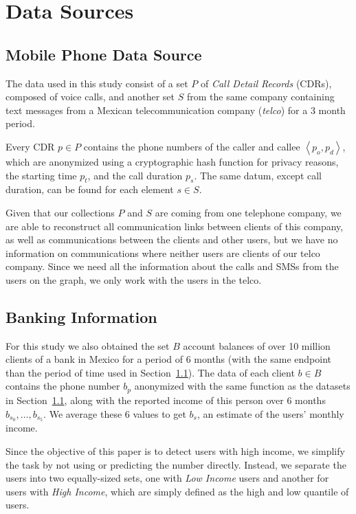 \section{Data Sources}
\label{sec:data_sources}

\subsection{Mobile Phone Data Source}
\label{subsec:telcoinformation}

The data used in this study consist of a set $P$ of \textit{Call Detail Records} (CDRs), composed of voice calls, and another set $S$ from the same company containing text messages from a Mexican telecommunication company (\textit{telco}) for a 3 month period.

Every CDR $p \in P$ contains the phone numbers of the caller and callee $\left< p_o, p_d \right>$, which are anonymized using a cryptographic hash function for privacy reasons, the starting time \( p_t \), and the call duration \( p_s \). The same datum, except call duration, can be found for each element $s \in S$.

Given that our collections $P$ and $S$ are coming from one telephone company, we are able to reconstruct all communication links between clients of this company, as well as communications between the clients and other users, but we have no information on communications where neither users are clients of our telco company. Since we need all the information about the calls and SMSs from the users on the graph, we only work with the users in the telco.

\subsection{Banking Information}

For this study we also obtained the set $B$ account balances of over 10 million clients of a bank in Mexico for a period of 6 months (with the same endpoint than the period of time used in Section~\ref{subsec:telcoinformation}). The data of each client $b \in B$ contains the phone number $b_p$ anonymized with the same function as the datasets in Section~\ref{subsec:telcoinformation}, along with the reported income of this person over 6 months $b_{s_0}, \ldots, b_{s_5}$. We average these 6 values to get $b_s$, an estimate of the users' monthly income.

Since the objective of this paper is to detect users with high income, we simplify the task by not using or predicting the number directly. Instead, we separate the users into two equally-sized sets, one with \emph{Low Income} users and another for users with \emph{High Income}, which are simply defined as the high and low quantile of users.
